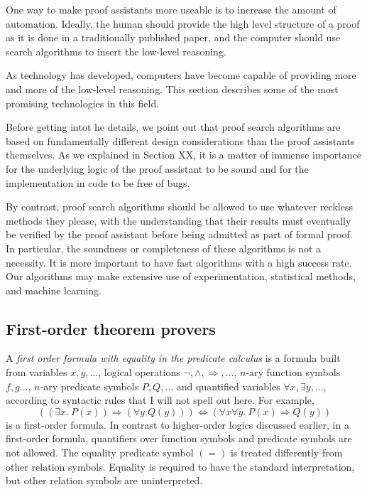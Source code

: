 \documentclass[brochure,english,12pt]{bourbaki}
\theoremstyle{plain}
\begin{document}
One way to make proof assistants more useable is to increase the amount of
automation.   Ideally, the human should provide the high level structure of a proof
as it is done in a traditionally published paper, and the computer should use
search algorithms to insert the low-level reasoning.   

As technology has developed, computers have become capable of providing
more and more of the low-level reasoning.   This section describes some of
the most promising technologies in this field.

Before getting intot he details, we point out that proof search algorithms
are based on fundamentally different design considerations than the proof
assistants themselves.  As we explained in Section XX, it is a matter of
immense importance for the underlying logic of the proof assistant to be sound
and for the implementation in code to be free of bugs.  

By contrast, proof search algorithms should be allowed to use whatever
reckless methods they please, with the understanding that their results must
eventually be verified by  the proof assistant before being admitted as part of
formal proof.  In particular, the soundness or completeness of these algorithms
is not a necessity.  It is more important to have fast algorithms with a high
success rate.  Our algorithms may make extensive use of
experimentation, statistical methods, and machine learning.



\subsection{First-order theorem provers}



A {\it first order formula with equality in the predicate calculus} is a formula built
from variables $x,y,\ldots$, logical operations $\neg, \land, \Rightarrow,\ldots$, $n$-ary function symbols $f,g\ldots$, 
 $n$-ary predicate symbols $P, Q,\ldots$  and quantified variables $\forall x, \exists y,\ldots$,
according to syntactic rules that I will not spell out here.     For example,
\[
((\exists x.~P(x)) \Rightarrow (\forall y. Q(y))) \Leftrightarrow (\forall x\forall y.~P(x)\Rightarrow Q(y))
\]
is a first-order formula.
In contrast to higher-order logics discussed earlier, in a first-order formula,
quantifiers over function symbols and predicate symbols are not allowed.
The equality predicate  symbol $(=)$ is treated differently from other relation symbols.  Equality is required to have the
standard interpretation, but other relation symbols are uninterpreted.
\end{document}
